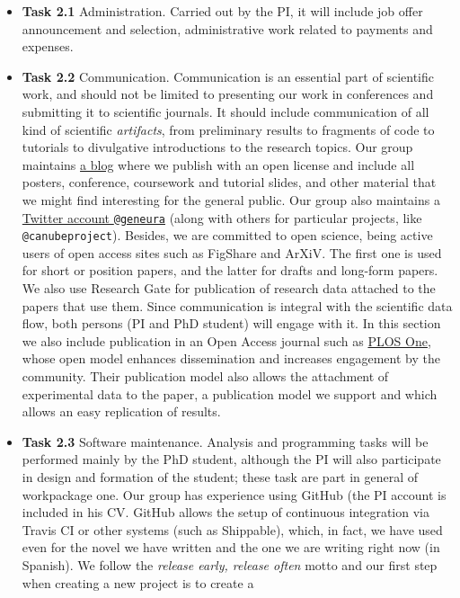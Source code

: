 \documentclass[a4paper,12pt,twocolumn]{article}
\begin{document}
\begin{itemize}
\item {\bf Task 2.1}  Administration. Carried out by the PI, it will
  include job offer announcement and selection, administrative work
  related to payments and expenses.
\item {\bf Task 2.2} Communication. Communication is an essential part
  of scientific work, and should not be limited to presenting our work
  in conferences and submitting it to scientific journals. It should
  include communication of all kind of scientific {\em artifacts},
  from preliminary results to fragments of code to tutorials to
  divulgative introductions to the research topics. Our group
  maintains \href{http://geneura.wordpress.com}{a blog} where we
  publish with an open license and include all posters, conference,
  coursework and tutorial slides, and other material that we might
  find interesting for the general public. Our group also maintains a
  \href{http://twitter.com}{Twitter account {\tt @geneura}} (along
  with others for particular projects, like {\tt @canubeproject}). Besides, we are committed
  to open science, being active users of open access sites such as
  FigShare and ArXiV. 
The first one is used for short or position
  papers, and the latter for drafts and long-form papers. We also use
  Research Gate for publication of research data attached to the
  papers that use them. Since communication is integral with the
  scientific data flow, both persons (PI and PhD student) will engage
  with it. In this section we also include publication in an Open
  Access journal such as \href{http://plosone.org}{PLOS One}, whose
  open model enhances dissemination and increases engagement by the
  community. Their publication model also allows the attachment of
  experimental data to the paper, a publication model we support and
  which allows an easy replication of results. 
\item{\bf Task 2.3} Software maintenance. Analysis and programming
  tasks will be performed mainly by the PhD student, although the PI
  will also participate in design and formation of the student; these
  task are part in general of workpackage one. Our
  group has experience using GitHub (the PI account is included in his
  CV. GitHub allows the setup of continuous integration via Travis CI
  or other systems (such as Shippable), which, in fact, we have used
  even for the novel we have written and the one we are writing right
  now (in Spanish). We follow the {\em release early, release often}
  motto and our first step when creating a new project is to create a

\end{itemize}
\end{document}
